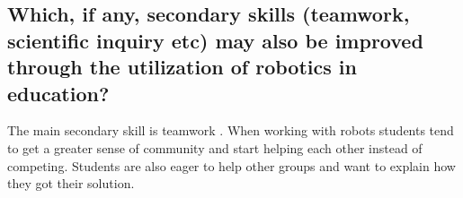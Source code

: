 \subsection*{Which, if any, secondary skills (teamwork, scientific inquiry etc) may also be improved through the utilization of robotics in education?}

The main secondary skill is teamwork \cite{mitnik2009collaborative, }. When working with robots students tend to get a greater sense of community and start helping each other instead of competing. Students are also eager to help other groups and want to explain how they got their solution.

